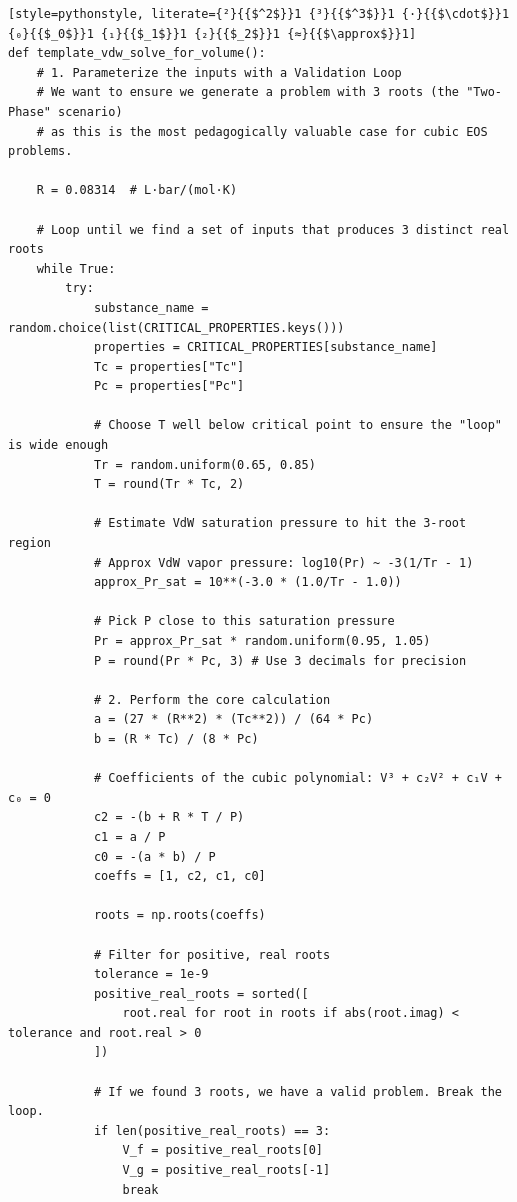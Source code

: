 \begin{lstlisting}[style=pythonstyle, literate={²}{{$^2$}}1 {³}{{$^3$}}1 {·}{{$\cdot$}}1 {₀}{{$_0$}}1 {₁}{{$_1$}}1 {₂}{{$_2$}}1 {≈}{{$\approx$}}1]
def template_vdw_solve_for_volume():
    # 1. Parameterize the inputs with a Validation Loop
    # We want to ensure we generate a problem with 3 roots (the "Two-Phase" scenario)
    # as this is the most pedagogically valuable case for cubic EOS problems.

    R = 0.08314  # L·bar/(mol·K)

    # Loop until we find a set of inputs that produces 3 distinct real roots
    while True:
        try:
            substance_name = random.choice(list(CRITICAL_PROPERTIES.keys()))
            properties = CRITICAL_PROPERTIES[substance_name]
            Tc = properties["Tc"]
            Pc = properties["Pc"]

            # Choose T well below critical point to ensure the "loop" is wide enough
            Tr = random.uniform(0.65, 0.85)
            T = round(Tr * Tc, 2)

            # Estimate VdW saturation pressure to hit the 3-root region
            # Approx VdW vapor pressure: log10(Pr) ~ -3(1/Tr - 1)
            approx_Pr_sat = 10**(-3.0 * (1.0/Tr - 1.0))

            # Pick P close to this saturation pressure
            Pr = approx_Pr_sat * random.uniform(0.95, 1.05)
            P = round(Pr * Pc, 3) # Use 3 decimals for precision

            # 2. Perform the core calculation
            a = (27 * (R**2) * (Tc**2)) / (64 * Pc)
            b = (R * Tc) / (8 * Pc)

            # Coefficients of the cubic polynomial: V³ + c₂V² + c₁V + c₀ = 0
            c2 = -(b + R * T / P)
            c1 = a / P
            c0 = -(a * b) / P
            coeffs = [1, c2, c1, c0]

            roots = np.roots(coeffs)

            # Filter for positive, real roots
            tolerance = 1e-9
            positive_real_roots = sorted([
                root.real for root in roots if abs(root.imag) < tolerance and root.real > 0
            ])

            # If we found 3 roots, we have a valid problem. Break the loop.
            if len(positive_real_roots) == 3:
                V_f = positive_real_roots[0]
                V_g = positive_real_roots[-1]
                break


\end{lstlisting}
